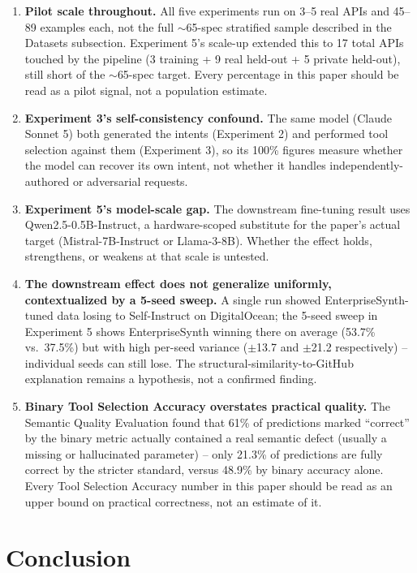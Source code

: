 \documentclass[letterpaper]{article} %
\begin{document}
\begin{enumerate}
    \item \textbf{Pilot scale throughout.} All five experiments run on 3--5
    real APIs and 45--89 examples each, not the full $\sim$65-spec stratified sample described in
    the Datasets subsection. Experiment 5's scale-up extended this to 17 total APIs touched by the
    pipeline (3 training + 9 real held-out + 5 private held-out), still short of the $\sim$65-spec
    target. Every percentage in this paper should be read as a pilot signal, not a population
    estimate.
    \item \textbf{Experiment 3's self-consistency confound.} The same model (Claude Sonnet 5)
    both generated the intents (Experiment 2) and performed tool selection against them
    (Experiment 3), so its 100\% figures measure whether the model can recover its own intent,
    not whether it handles independently-authored or adversarial requests.
    \item \textbf{Experiment 5's model-scale gap.} The downstream fine-tuning result uses
    Qwen2.5-0.5B-Instruct, a hardware-scoped substitute for the paper's actual target
    (Mistral-7B-Instruct or Llama-3-8B). Whether the effect holds, strengthens, or weakens at that
    scale is untested.
    \item \textbf{The downstream effect does not generalize uniformly, contextualized by a 5-seed
    sweep.} A single run showed EnterpriseSynth-tuned data losing to Self-Instruct on
    DigitalOcean; the 5-seed sweep in Experiment 5 shows EnterpriseSynth winning there on average
    (53.7\% vs.\ 37.5\%) but with high per-seed variance ($\pm$13.7 and $\pm$21.2 respectively) --
    individual seeds can still lose. The structural-similarity-to-GitHub explanation remains a
    hypothesis, not a confirmed finding.
    \item \textbf{Binary Tool Selection Accuracy overstates practical quality.} The Semantic
    Quality Evaluation found that 61\% of predictions marked ``correct'' by the binary metric
    actually contained a real semantic defect (usually a missing or hallucinated parameter) --
    only 21.3\% of predictions are fully correct by the stricter standard, versus 48.9\% by binary
    accuracy alone. Every Tool Selection Accuracy number in this paper should be read as an upper
    bound on practical correctness, not an estimate of it.
\end{enumerate}

\section{Conclusion}
\end{document}
